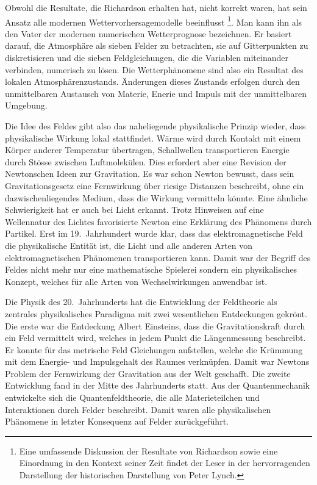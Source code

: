 Obwohl die Resultate, die Richardson erhalten hat, nicht korrekt waren,
hat sein Ansatz alle modernen Wettervorhersagemodelle beeinflusst%
\footnote{Eine umfassende Diskussion der Resultate von Richardson sowie
eine Einordnung in den Kontext seiner Zeit findet der Leser in der
hervorragenden Darstellung der historischen Darstellung \cite{buch:lynch}
von Peter Lynch.}.
Man kann ihn als den Vater der modernen numerischen Wetterprognose
bezeichnen.
Er basiert darauf, die Atmosphäre als sieben Felder zu betrachten,
sie auf Gitterpunkten zu diskretisieren und die sieben Feldgleichungen,
die die Variablen miteinander verbinden, numerisch zu lösen.
Die Wetterphänomene sind also ein Resultat des lokalen Atmosphärenzustands.
Änderungen dieses Zustands erfolgen durch den unmittelbaren Austausch
von Materie, Enerie und Impuls mit der unmittelbaren Umgebung.

Die Idee des Feldes gibt also das naheliegende physikalische Prinzip
wieder, dass physikalische Wirkung lokal stattfindet.
%
Wärme wird durch Kontakt mit einem Körper anderer Temperatur übertragen,
Schallwellen transportieren Energie durch Stösse zwischen Luftmolekülen.
%
Dies erfordert aber eine Revision der Newtonschen Ideen zur
Gravitation.
Es war schon Newton bewusst, dass sein Gravitationsgesetz eine 
Fernwirkung über riesige Distanzen beschreibt, ohne ein dazwischenliegendes
Medium, dass die Wirkung vermitteln könnte.
Eine ähnliche Schwierigkeit hat er auch bei Licht erkannt.
Trotz Hinweisen auf eine Wellennatur des Lichtes favorisierte Newton
eine Erklärung des Phänomens durch Partikel.
Erst im 19.~Jahrhundert wurde klar, dass das elektromagnetische Feld
%
die physikalische Entität ist, die Licht und alle anderen Arten von
elektromagnetischen Phänomenen transportieren kann.
Damit war der Begriff des Feldes nicht mehr nur eine mathematische
Spielerei sondern ein physikalisches Konzept, welches für alle Arten
von Wechselwirkungen anwendbar ist.

Die Physik des 20.~Jahrhunderts hat die Entwicklung der Feldtheorie als
zentrales physikalisches Paradigma mit zwei wesentlichen Entdeckungen
gekrönt.
Die erste war die Entdeckung Albert Einsteins, dass die Gravitationskraft
%
%
durch ein Feld vermittelt wird, welches in jedem Punkt die Längenmessung
beschreibt.
Er konnte für das metrische Feld Gleichungen aufstellen, welche die
Krümmung mit dem Energie- und Impulsgehalt des Raumes verknüpfen.
%
Damit war Newtons Problem der Fernwirkung der Gravitation aus der Welt
geschafft.
Die zweite Entwicklung fand in der Mitte des Jahrhunderts statt.
Aus der Quantenmechanik entwickelte sich die Quantenfeldtheorie, die
%
%
alle Materieteilchen und Interaktionen durch Felder beschreibt.
Damit waren alle physikalischen Phänomene in letzter Konsequenz auf
Felder zurückgeführt.

